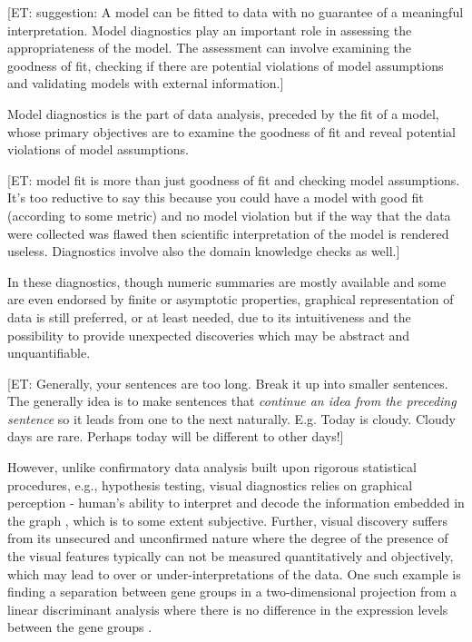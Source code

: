 \documentclass{monashthesis}
\begin{document}
{[}ET: suggestion: A model can be fitted to data with no guarantee of a meaningful interpretation. Model diagnostics play an important role in assessing the appropriateness of the model. The assessment can involve examining the goodness of fit, checking if there are potential violations of model assumptions and validating models with external information.{]}

Model diagnostics is the part of data analysis, preceded by the fit of a model, whose primary objectives are to examine the goodness of fit and reveal potential violations of model assumptions.

{[}ET: model fit is more than just goodness of fit and checking model assumptions. It's too reductive to say this because you could have a model with good fit (according to some metric) and no model violation but if the way that the data were collected was flawed then scientific interpretation of the model is rendered useless. Diagnostics involve also the domain knowledge checks as well.{]}

In these diagnostics, though numeric summaries are mostly available and some are even endorsed by finite or asymptotic properties, graphical representation of data is still preferred, or at least needed, due to its intuitiveness and the possibility to provide unexpected discoveries which may be abstract and
unquantifiable.

{[}ET: Generally, your sentences are too long. Break it up into smaller sentences. The generally idea is to make sentences that \emph{continue an idea from the preceding sentence} so it leads from one to the next naturally. E.g. Today is cloudy. Cloudy days are rare. Perhaps today will be different to other days!{]}

However, unlike confirmatory data analysis built upon rigorous statistical procedures, e.g., hypothesis testing, visual diagnostics relies on graphical perception - human's ability to interpret and decode the information embedded in the graph \autocite{cleveland_graphical_1984}, which is to some extent subjective. Further, visual discovery suffers from its unsecured and unconfirmed nature where the degree of the presence of the visual features typically can not be measured quantitatively and objectively, which may lead to over or under-interpretations of the data. One such example is finding a separation between gene groups in a two-dimensional projection from a linear discriminant analysis where there is no difference in the expression levels between the gene groups \autocite{roy_chowdhury_using_2015}.
\end{document}
